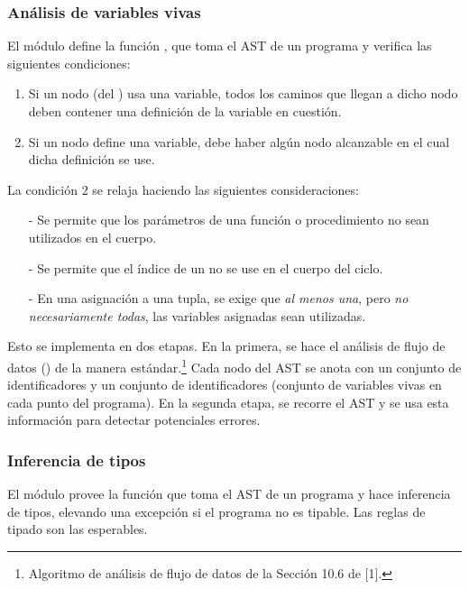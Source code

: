 \documentclass{article}
\begin{document}
\subsubsection{An\'alisis de variables vivas}

El m\'odulo  define la funci\'on ,
que toma el AST de un programa y verifica las siguientes condiciones:
  \begin{enumerate}
  \item Si un nodo (del ) usa una variable,
        todos los caminos que llegan a dicho nodo deben contener
        una definici\'on de la variable en cuesti\'on.
           
  \item Si un nodo define una variable, debe
        haber alg\'un nodo alcanzable en el cual dicha
        definici\'on se use.
  \end{enumerate}

La condici\'on 2 se relaja haciendo las siguientes consideraciones:
\begin{itemize}
\item[-] Se permite que los par\'ametros de una funci\'on
         o procedimiento no sean utilizados en el cuerpo.
\item[-] Se permite que el \'indice de un 
         no se use en el cuerpo del ciclo.
\item[-] En una asignaci\'on a una tupla, se exige que
         {\em{al menos una}}, pero {\em{no necesariamente todas}},
         las variables asignadas sean utilizadas.
\end{itemize}

Esto se implementa en dos etapas. En la primera,
se hace el an\'alisis de flujo de datos () 
de la manera est\'andar.\footnote{
Algoritmo de an\'alisis de flujo de datos de la Secci\'on 10.6 de [1].}
Cada nodo del AST se anota con
un conjunto de identificadores
 y un conjunto de identificadores 
(conjunto de variables vivas en cada punto del programa).
En la segunda etapa, se recorre el AST y se usa esta
informaci\'on para detectar potenciales errores.

\subsubsection{Inferencia de tipos}

El m\'odulo  provee la funci\'on 
que toma el AST de un programa \Gbs y hace inferencia de tipos,
elevando una excepci\'on si el programa no es tipable.
Las reglas de tipado son las esperables.
\end{document}
